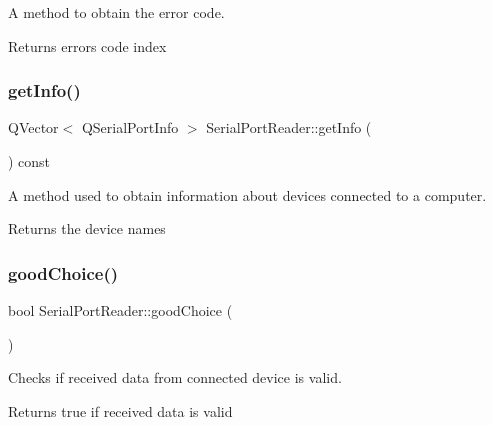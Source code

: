 A method to obtain the error code. 

\begin{DoxyReturn}{Returns}
error\textquotesingle{}s code index 
\end{DoxyReturn}
\mbox{\label{class_serial_port_reader_a5a919fb6b06f5505de1aababcde045f6}} 
\subsubsection{\texorpdfstring{get\+Info()}{getInfo()}}
{\footnotesize\ttfamily Q\+Vector$<$ Q\+Serial\+Port\+Info $>$ Serial\+Port\+Reader\+::get\+Info (\begin{DoxyParamCaption}{ }\end{DoxyParamCaption}) const}



A method used to obtain information about devices connected to a computer. 

\begin{DoxyReturn}{Returns}
the device names 
\end{DoxyReturn}
\mbox{\label{class_serial_port_reader_aba5b7292f941e824467f5b1134f7f15f}} 
\subsubsection{\texorpdfstring{good\+Choice()}{goodChoice()}}
{\footnotesize\ttfamily bool Serial\+Port\+Reader\+::good\+Choice (\begin{DoxyParamCaption}{ }\end{DoxyParamCaption})\hspace{0.3cm}{\ttfamily [private]}}



Checks if received data from connected device is valid. 

\begin{DoxyReturn}{Returns}
true if received data is valid 
\end{DoxyReturn}
\mbox{\label{class_serial_port_reader_afb9bdbade338b204f487f2c0d4535911}} 
